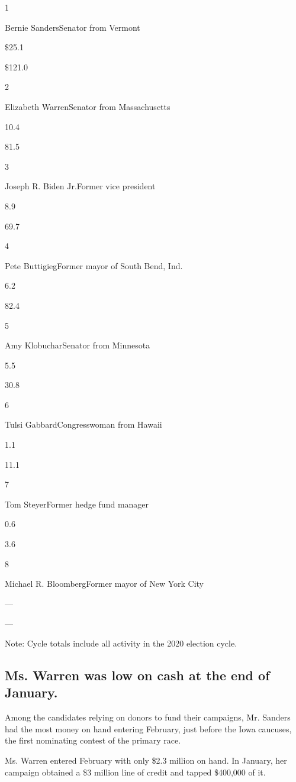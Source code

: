 1

Bernie SandersSenator from Vermont

\$25.1

\$121.0

2

Elizabeth WarrenSenator from Massachusetts

10.4

81.5

3

Joseph R. Biden Jr.Former vice president

8.9

69.7

4

Pete ButtigiegFormer mayor of South Bend, Ind.

6.2

82.4

5

Amy KlobucharSenator from Minnesota

5.5

30.8

6

Tulsi GabbardCongresswoman from Hawaii

1.1

11.1

7

Tom SteyerFormer hedge fund manager

0.6

3.6

8

Michael R. BloombergFormer mayor of New York City

---

---

Note: Cycle totals include all activity in the 2020 election cycle.

\hypertarget{ms-warren-was-low-on-cash-at-the-end-of-january}{%
\subsection{Ms. Warren was low on cash at the end of
January.}\label{ms-warren-was-low-on-cash-at-the-end-of-january}}

Among the candidates relying on donors to fund their campaigns, Mr.
Sanders had the most money on hand entering February, just before the
Iowa caucuses, the first nominating contest of the primary race.

Ms. Warren entered February with only \$2.3 million on hand. In January,
her campaign obtained a \$3 million line of credit and tapped \$400,000
of it.

